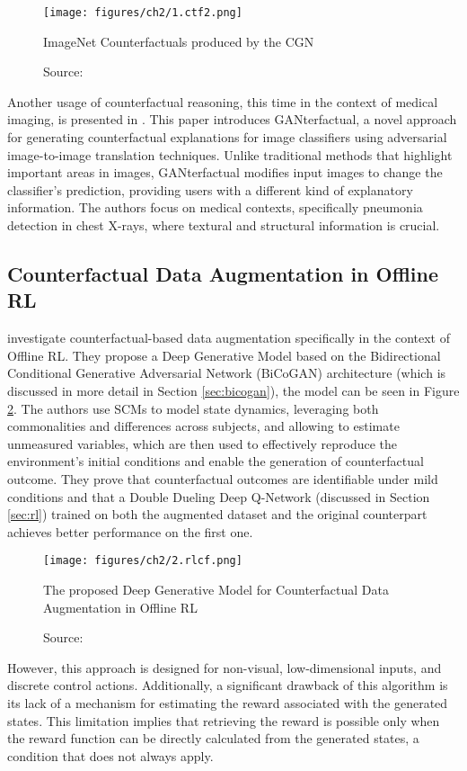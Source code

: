 \begin{figure}[ht]
    \centering
    \texttt{[image: figures/ch2/1.ctf2.png]}
    \caption{ImageNet Counterfactuals produced by the CGN}
    \vspace{-10px}
    \caption*{\scriptsize{Source: \cite{sauer2021}}}
    \label{fig:ctf}
\end{figure}

Another usage of counterfactual reasoning,
this time in the context of medical imaging,
is presented in \cite{mertes2022}.
This paper introduces GANterfactual,
a novel approach for generating counterfactual
explanations for image classifiers using adversarial
image-to-image translation techniques.
Unlike traditional methods that highlight
important areas in images, GANterfactual
modifies input images to change the
classifier's prediction,
providing users with a different kind
of explanatory information.
The authors focus on medical contexts,
specifically pneumonia detection in chest X-rays,
where textural and structural information is crucial.

\subsection{Counterfactual Data Augmentation in Offline RL}

\cite{lu2020} investigate counterfactual-based
data augmentation
specifically in the context of Offline RL.
They propose a Deep Generative Model based on the
Bidirectional Conditional Generative Adversarial Network
(BiCoGAN) architecture (which is discussed in more detail
in Section \ref{sec:bicogan}), the model
can be seen in Figure \ref{fig:rlcf}.
The authors use SCMs
to model state dynamics, leveraging both
commonalities and differences across subjects,
and allowing to estimate unmeasured variables,
which are then used to effectively
reproduce the environment’s initial conditions
and enable the
generation of counterfactual outcome.
They prove that counterfactual outcomes are identifiable
under mild conditions and that a Double Dueling
Deep Q-Network (discussed in Section \ref{sec:rl})
trained on both the augmented dataset and the original
counterpart achieves better performance on the first one.

\begin{figure}[h]
    \centering
    \texttt{[image: figures/ch2/2.rlcf.png]}
    \caption{The proposed Deep Generative Model for Counterfactual Data Augmentation in Offline RL}
    \vspace{-10px}
    \caption*{\scriptsize{Source: \cite{lu2020}}}
    \label{fig:rlcf}
\end{figure}

However, this approach is designed for non-visual,
low-dimensional inputs, and discrete control
actions. Additionally, a significant drawback of this algorithm
is its lack of a mechanism for estimating the reward
associated with the generated states. This limitation implies
that retrieving the reward is possible only when the reward
function can be directly calculated from the generated states,
a condition that does not always apply.
 